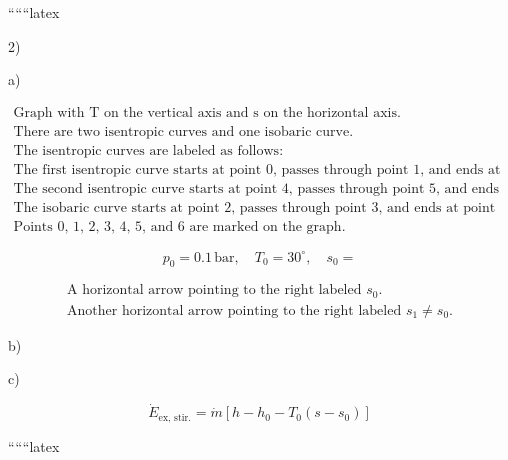 
``````latex


2) 

a) 

\[
\begin{array}{c}
\text{Graph with T on the vertical axis and s on the horizontal axis.} \\
\text{There are two isentropic curves and one isobaric curve.} \\
\text{The isentropic curves are labeled as follows:} \\
\text{The first isentropic curve starts at point 0, passes through point 1, and ends at point 2.} \\
\text{The second isentropic curve starts at point 4, passes through point 5, and ends at point 6.} \\
\text{The isobaric curve starts at point 2, passes through point 3, and ends at point 4.} \\
\text{Points 0, 1, 2, 3, 4, 5, and 6 are marked on the graph.}
\end{array}
\]

\[
p_0 = 0.1 \, \text{bar}, \quad T_0 = 30^\circ, \quad s_0 = 
\]

\[
\begin{array}{c}
\text{A horizontal arrow pointing to the right labeled } s_0. \\
\text{Another horizontal arrow pointing to the right labeled } s_1 \neq s_0.
\end{array}
\]

b) 

c) 

\[
\dot{E}_{\text{ex, stir.}} = \dot{m} \left[ h - h_0 - T_0 (s - s_0) \right]
\]

``````latex


